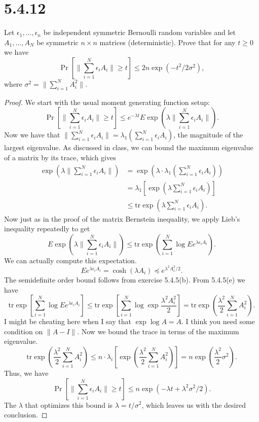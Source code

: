 \documentclass[11pt,letterpaper]{report}
\newcommand{\tr}{\text{tr}}
\begin{document}
\section*{5.4.12}
Let $\epsilon_1, \ldots, \epsilon_n$ be independent symmetric Bernoulli random variables and let $A_1, \ldots, A_N$ be symmetric $n\times n$ matrices (deterministic). Prove that for any $t\geq 0$ we have
\[
\Pr\left[\bigg\|\sum_{i=1}^N\epsilon_iA_i\bigg\|\geq t\right] \leq 2n\exp(-t^2/2\sigma^2),
\]
where $\sigma^2 = \|\sum_{i=1}^NA_i^2\|$.
\begin{proof}
	We start with the usual moment generating function setup:
	\[
	\Pr\left[\bigg\|\sum_{i=1}^N\epsilon_iA_i\bigg\|\geq t\right] \leq e^{-\lambda t}E\exp\left(\lambda \bigg\|\sum_{i=1}^N\epsilon_iA_i\bigg\|\right).
	\]
	Now we have that $\|\sum_{i=1}^N\epsilon_iA_i\| = \lambda_1(\sum_{i=1}^N\epsilon_iA_i)$, the magnitude of the largest eigenvalue. As discussed in class, we can bound the maximum eigenvalue of a matrix by its trace, which gives
	\begin{align*}
		\exp\left(\lambda \bigg\|\sum_{i=1}^N\epsilon_iA_i\bigg\|\right) &= \exp\left(\lambda\cdot \lambda_1\left(\sum_{i=1}^N\epsilon_iA_i\right) \right)\\
		&= \lambda_1\left[\exp\left(\lambda \sum_{i=1}^N\epsilon_iA_i \right) \right]\\
		&\leq \tr \exp\left(\lambda\sum_{i=1}^N\epsilon_iA_i\right).
	\end{align*}
	Now just as in the proof of the matrix Bernstein inequality, we apply Lieb's inequality repeatedly to get
	\[
	E\exp\left(\lambda \bigg\|\sum_{i=1}^N\epsilon_iA_i\big\|\right) \leq \tr \exp\left(\sum_{i=1}^N\log E e^{\lambda \epsilon_iA_i}\right).
	\]
	We can actually compute this expectation.
	\[
	Ee^{\lambda \epsilon_i A_i} = \cosh(\lambda A_i) \preceq e^{\lambda^2A_i^2/2}.
	\]
	The semidefinite order bound follows from exercise 5.4.5(b). From 5.4.5(e) we have
	\[
	\tr\exp\left[\sum_{i=1}^N\log Ee^{\lambda \epsilon_iA_i}\right] \leq \tr \exp\left[ \sum_{i=1}^N\log \exp \frac{\lambda^2A_i^2}{2}\right] = \tr \exp\left(\frac{\lambda^2}{2}\sum_{i=1}^NA_i^2\right).
	\]
	I might be cheating here when I say that $\exp \log A = A$. I think you need some condition on $\|A-I\|$. Now we bound the trace in terms of the maximum eigenvalue.
	\[
	\tr \exp\left(\frac{\lambda^2}{2}\sum_{i=1}^NA_i^2\right) \leq n\cdot \lambda_i\left[ \exp\left(\frac{\lambda^2}{2}\sum_{i=1}^NA_i^2\right)\right] = n\exp\left(\frac{\lambda^2}{2}\sigma^2\right).
	\]
	Thus, we have
	\[
	\Pr\left[\bigg\|\sum_{i=1}^N\epsilon_iA_i\bigg\|\geq t\right] \leq n\exp(-\lambda t + \lambda^2\sigma^2/2).
	\]
	The $\lambda$ that optimizes this bound is $\lambda = t/\sigma^2$, which leaves us with the desired conclusion.
\end{proof}
\end{document}
